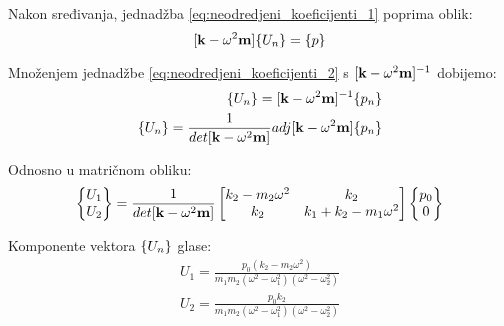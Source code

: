 Nakon sređivanja, jednadžba \eqref{eq:neodredjeni_koeficijenti_1} poprima oblik:
\begin{equation}\label{eq:neodredjeni_koeficijenti_2}
    [\kk-\omega^2\mm]\vtor{U_n}{}=\vtor{p}{}
\end{equation}

%

Množenjem jednadžbe \eqref{eq:neodredjeni_koeficijenti_2} s $[\mathbf{k}-\omega^2\mathbf{m}]^{-1}$
dobijemo:
\begin{equation}
    \begin{split}
        \vtor{U_n}{}=[\kk-\omega^2\mm]^{-1}\vtor{p_n}{} \notag\\
        \vtor{U_n}{}=\frac{1}{det[\kk-\omega^2\mm]}adj[\kk-\omega^2\mm]\vtor{p_n}{}\label{eqneodredjeni_koeficijenti_3}
    \end{split}
\end{equation}

Odnosno u matričnom obliku:
\begin{equation}
    \begin{Bmatrix}
        U_1\\
        U_2
    \end{Bmatrix}
    =
    \frac{1}{det[\mathbf{k}-\omega^2\mathbf{m}]}
        \begin{bmatrix}
            k_2-m_2\omega^2 & k_2\\
            k_2 & k_1+k_2-m_1\omega^2
        \end{bmatrix}
        \begin{Bmatrix}
            p_0\\
            0
        \end{Bmatrix}
\end{equation}

Komponente vektora $\vtor{U_n}{}$ glase:
\begin{align}
    U_1=\frac{p_0(k_2-m_2\omega^2)}{m_1m_2(\omega^2-\omega_1^2)(\omega^2-\omega_2^2)} \label{eq:vtor_1_opce}\\
    U_2=\frac{p_0k_2}{m_1m_2(\omega^2-\omega_1^2)(\omega^2-\omega_2^2)}\label{eq:vtor_2_opce}
\end{align}


